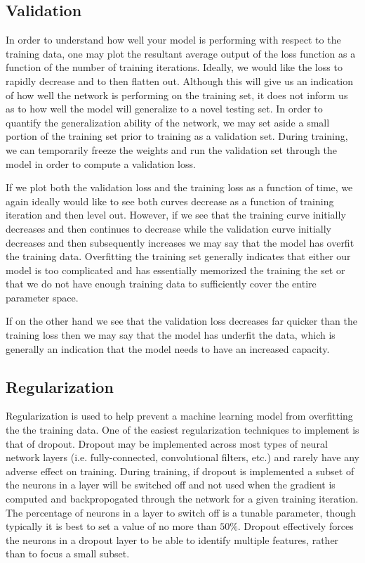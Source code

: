\subsection{Validation}
In order to understand how well your model is performing with respect to the training data, one may plot the resultant average output of the loss function as a function of the number of training iterations. Ideally, we would like the loss to rapidly decrease and to then flatten out. Although this will give us an indication of how well the network is performing on the training set, it does not inform us as to how well the model will generalize to a novel testing set. In order to quantify the generalization ability of the network, we may set aside a small portion of the training set prior to training as a validation set. During training, we can temporarily freeze the weights and run the validation set through the model in order to compute a validation loss. 

If we plot both the validation loss and the training loss as a function of time, we again ideally would like to see both curves decrease as a function of training iteration and then level out. However, if we see that the training curve initially decreases and then continues to decrease while the validation curve initially decreases and then subsequently increases we may say that the model has overfit the training data. Overfitting the training set generally indicates that either our model is too complicated and has essentially memorized the training the set or that we do not have enough training data to sufficiently cover the entire parameter space. 

If on the other hand we see that the validation loss decreases far quicker than the training loss then we may say that the model has underfit the data, which is generally an indication that the model needs to have an increased capacity.

%
%
\subsection{Regularization}

%
%
Regularization is used to help prevent a machine learning model from overfitting the the training data. One of the easiest regularization techniques to implement is that of dropout. Dropout may be implemented across most types of neural network layers (i.e. fully-connected, convolutional filters, etc.) and rarely have any adverse effect on training. During training, if dropout is implemented a subset of the neurons in a layer will be switched off and not used when the gradient is computed and backpropogated through the network for a given training iteration. The percentage of neurons in a layer to switch off is a tunable parameter, though typically it is best to set a value of no more than $50\%$. Dropout effectively forces the neurons in a dropout layer to be able to identify multiple features, rather than to focus a small subset.

